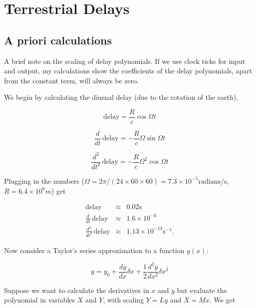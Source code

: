 \documentclass[a4paper]{article}
\begin{document}
\section{Terrestrial Delays}
\subsection{A priori calculations}
\label{sec:intro}
A brief note on the scaling of delay polynomials.  If we use clock
ticks for input and output, my calculations show the coefficients of
the delay polynomials, apart from the constant term, will always be
zero.

We begin by calculating the diurnal delay (due to the rotation of the
earth),

\begin{equation}
  \label{eq:delay}
\mathrm{delay} = \frac{R}{c} \cos\Omega t  
\end{equation}

\begin{equation}
  \label{eq:drate}
  \frac{d}{dt}\,\mathrm{delay} = -\frac{R}{c} \Omega \sin\Omega t  
\end{equation}

\begin{equation}
  \label{eq:drate2}
  \frac{d^2}{dt^2}\,\mathrm{delay} = -\frac{R}{c} \Omega^2 \cos\Omega t    
\end{equation}

Plugging in the numbers ($\Omega = 2\pi/(24\times 60\times 60) =
7.3\times 10^{-5} \mathrm{radians}/\mathrm{s}$, $R = 6.4\times 10^6 m$) get

\begin{eqnarray}
\mathrm{delay} &\approx& 0.02 \mathrm{s} \label{eq:scales}\\
\frac{d}{dt}\,\mathrm{delay} &\approx& 1.6\times 10^{-6}  \label{eq:scalesdd}\\
\frac{d^2}{dt^2}\,\mathrm{delay} &\approx& 1.13\times 10^{-13} \mathrm{s}^{-1}\label{eq:scalesd2d}.
\end{eqnarray}

Now consider a Taylor's series approximation to a function $y(x)$:

\begin{equation*}
  y = y_0 + \frac{dy}{dx} \delta x + \frac{1}{2} \frac{d^2 y}{dx^2} \delta x^2
\end{equation*}

Suppose we want to calculate the derivatives in $x$ and $y$ but
evaluate the polynomial in variables $X$ and $Y$, with scaling $Y=Ly$
and $X=Mx$.  We get
\end{document}
